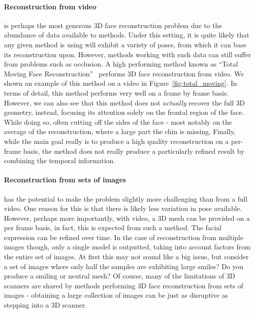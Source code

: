 \paragraph{Reconstruction from video} is perhaps the most generous 3D
face reconstruction problem due to the abundance of data available to
methods. Under this setting, it is quite likely that any given method
is using will exhibit a variety of poses, from which it can base its
reconstruction upon. However, methods working with such data can still
suffer from problems such as occlusion. A high performing method known
as ``Total Moving Face Reconstruction''~\cite{suwajanakorn2014total}
performs 3D face reconstruction from video. We shown an example of
this method on a video in Figure~\ref{fig:total_moving}. In terms of
detail, this method performs very well on a frame by frame
basis. However, we can also see that this method does not
\textit{actually} recover the full 3D geometry, instead, focusing its
attention solely on the frontal region of the face. While doing so,
often cutting off the sides of the face - most notably on the average
of the reconstruction, where a large part the chin is
missing. Finally, while the main goal really is to produce a high
quality reconstruction on a per-frame basis, the method does not
really produce a particularly refined result by combining the temporal
information.



\paragraph{Reconstruction from sets of images} has the potential to
make the problem slightly more challenging than from a full video. One
reason for this is that there is likely less variation in pose
available. However, perhaps more importantly, with video, a 3D mesh
can be provided on a per frame basis, in fact, this is expected from
such a method. The facial expression can be refined over time. In the
case of reconstruction from multiple images though, only a single
model is outputted, taking into account factors from the entire set of
images. At first this may not sound like a big issue, but consider a
set of images where only half the samples are exhibiting large smiles?
Do you produce a smiling or neutral mesh? Of course, many of the
limitations of 3D scanners are shared by methods performing 3D face
reconstruction from sets of images - obtaining a large collection of
images can be just as disruptive as stepping into a 3D scanner.

